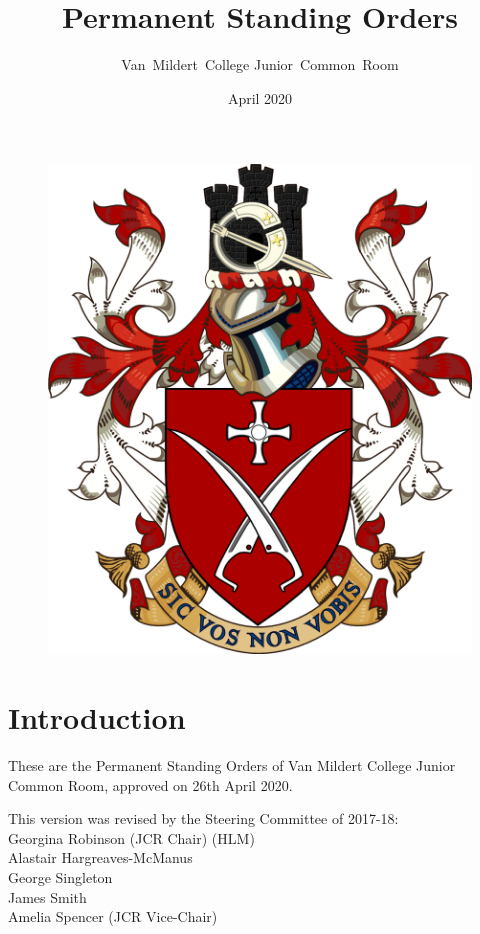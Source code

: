 \documentclass[12pt]{article}  %
\title{Permanent Standing Orders}
\author{Van~Mildert~College Junior~Common~Room}
\date{April 2020}
\begin{document}
\begin{titlepage}  %
    \maketitle
    \begin{figure}[h]
    \includegraphics[scale=0.25]{arms}  %
    \centering
    \end{figure}
    \thispagestyle{empty}
\end{titlepage}

\setcounter{page}{2}  %
\section*{Introduction}
These are the Permanent Standing Orders of Van Mildert College Junior Common Room, approved on 26th April 2020.

This version was revised by the Steering Committee of 2017-18:\\
\hspace*{2cm}Georgina Robinson (JCR Chair) (HLM)\\
\hspace*{2cm}Alastair Hargreaves-McManus\\
\hspace*{2cm}George Singleton\\
\hspace*{2cm}James Smith\\
\hspace*{2cm}Amelia Spencer (JCR Vice-Chair)
\end{document}
